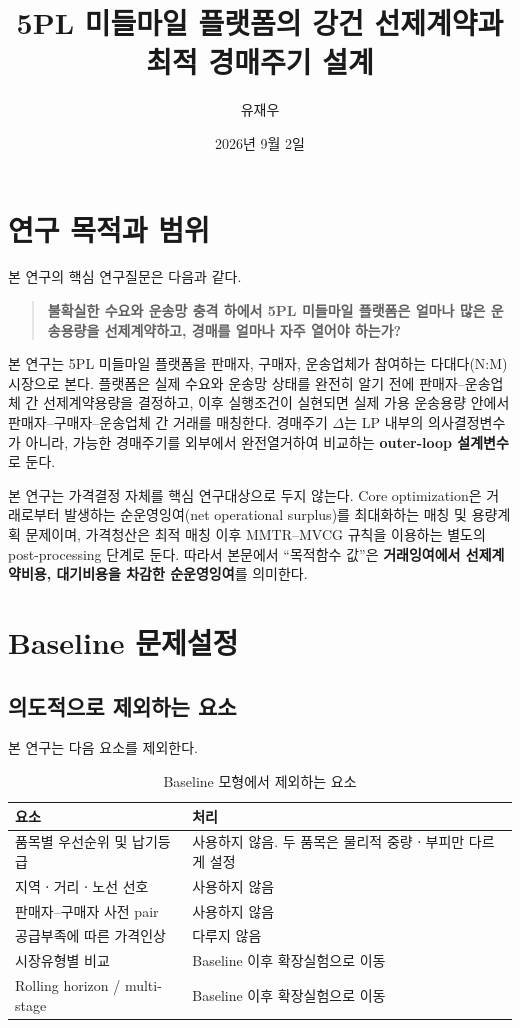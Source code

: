 \documentclass[11pt,a4paper]{article}
\title{\textbf{5PL 미들마일 플랫폼의 강건 선제계약과 최적 경매주기 설계}}
\author{유재우}
\date{2026년 9월 2일}
\begin{document}
\maketitle

\section{연구 목적과 범위}

본 연구의 핵심 연구질문은 다음과 같다.

\begin{quote}
\textbf{불확실한 수요와 운송망 충격 하에서 5PL 미들마일 플랫폼은 얼마나 많은 운송용량을 선제계약하고,
경매를 얼마나 자주 열어야 하는가?}
\end{quote}

본 연구는 5PL 미들마일 플랫폼을 판매자, 구매자, 운송업체가 참여하는 다대다(N:M) 시장으로 본다.
플랫폼은 실제 수요와 운송망 상태를 완전히 알기 전에 판매자--운송업체 간 선제계약용량을 결정하고,
이후 실행조건이 실현되면 실제 가용 운송용량 안에서 판매자--구매자--운송업체 간 거래를 매칭한다.
경매주기 $\Delta$는 LP 내부의 의사결정변수가 아니라, 가능한 경매주기를 외부에서 완전열거하여 비교하는
\textbf{outer-loop 설계변수}로 둔다.

본 연구는 가격결정 자체를 핵심 연구대상으로 두지 않는다.
Core optimization은 거래로부터 발생하는 순운영잉여(net operational surplus)를 최대화하는 매칭 및 용량계획 문제이며,
가격청산은 최적 매칭 이후 MMTR--MVCG 규칙을 이용하는 별도의 post-processing 단계로 둔다.
따라서 본문에서 ``목적함수 값''은
\textbf{거래잉여에서 선제계약비용, 대기비용을 차감한 순운영잉여}를 의미한다.

\section{Baseline 문제설정}

\subsection{의도적으로 제외하는 요소}

본 연구는 다음 요소를 제외한다.

\begin{table}[h!]
\centering
\caption{Baseline 모형에서 제외하는 요소}
\begin{tabularx}{0.94\textwidth}{@{}p{}X@{}}
\toprule
\textbf{요소} & \textbf{처리} \\
\midrule
품목별 우선순위 및 납기등급 & 사용하지 않음. 두 품목은 물리적 중량ㆍ부피만 다르게 설정 \\
지역ㆍ거리ㆍ노선 선호 & 사용하지 않음 \\
판매자--구매자 사전 pair & 사용하지 않음 \\
공급부족에 따른 가격인상 & 다루지 않음 \\
시장유형별 비교 & Baseline 이후 확장실험으로 이동 \\
Rolling horizon / multi-stage & Baseline 이후 확장실험으로 이동 \\
\bottomrule
\end{tabularx}
\end{table}
\end{document}
